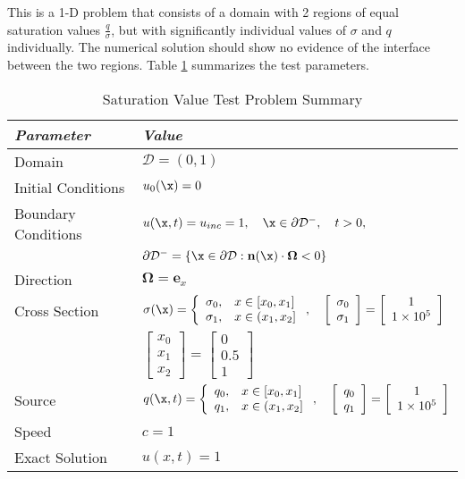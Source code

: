 This is a 1-D problem that consists of a domain with 2 regions of equal
saturation values $\frac{q}{\sigma}$, but with significantly individual values
of $\sigma$ and $q$ individually. The numerical solution should show no
evidence of the interface between the two regions.
Table \ref{tab:saturation} summarizes the test parameters.

\begin{table}[htb]\caption{Saturation Value Test Problem Summary}
\label{tab:saturation}
\centering
\begin{tabular}{l l}\toprule
\emph{Parameter} & \emph{Value}\\\midrule
Domain & $\mathcal{D} = (0,1)$\\
Initial Conditions & $u_0(\x)=0$\\
Boundary Conditions & $u(\x,t)=u_{inc}=1,\quad \x\in\partial\mathcal{D}^-,\quad t>0,$\\
   & $\partial\mathcal{D}^-=\{\x\in\partial\mathcal{D}:\mathbf{n}(\x)
     \cdot\mathbf{\Omega}<0\}$\\
Direction & $\mathbf{\Omega} = \mathbf{e}_x$\\
Cross Section & $\sigma(\x)=\left\{\begin{array}{c l}
   \sigma_0, & x\in[x_0,x_1]\\
   \sigma_1, & x\in(x_1,x_2]
   \end{array}\right.,\quad
   \left[\begin{array}{c}\sigma_0\\\sigma_1\end{array}\right] =
      \left[\begin{array}{c}1\\1\times 10^5\end{array}\right]$\\
   & $\left[\begin{array}{c}x_0\\x_1\\x_2\end{array}\right] =
      \left[\begin{array}{c}0\\0.5\\1\end{array}\right]$\\
Source & $q(\x,t)=\left\{\begin{array}{c l}
   q_0, & x\in[x_0,x_1]\\
   q_1, & x\in(x_1,x_2]
   \end{array}\right.,\quad
   \left[\begin{array}{c}q_0\\q_1\end{array}\right] =
      \left[\begin{array}{c}1\\1\times 10^5\end{array}\right]$\\
Speed & $c=1$\\
Exact Solution & $u(x,t) = 1$ \\
\bottomrule\end{tabular}
\end{table}

